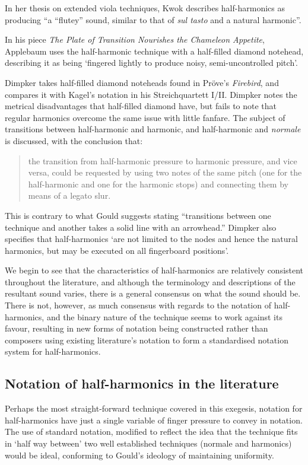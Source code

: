 In her thesis on extended viola techniques, Kwok describes half-harmonics as producing ``a “flutey” sound, similar to that of \emph{sul tasto} and a natural harmonic''.\autocite[]{kwokBreakingSoundBarriers2018}

In his piece \emph{The Plate of Transition Nourishes the Chameleon Appetite}, Applebaum uses the half-harmonic technique with a half-filled diamond notehead, describing it as being `fingered lightly to produce noisy, semi-uncontrolled pitch'.\autocite[]{applebaumPlateTransitionNourishes1992}

Dimpker takes half-filled diamond noteheads found in Pröve's \emph{Firebird}, and compares it with Kagel's notation in his Streichquartett I/II.\autocite[120--121]{dimpkerExtendedNotationDepiction2012}
Dimpker notes the metrical disadvantages that half-filled diamond have, but fails to note that regular harmonics overcome the same issue with little fanfare.
The subject of transitions between half-harmonic and harmonic, and half-harmonic and \emph{normale} is discussed, with the conclusion that:
\begin{quotation}
  the transition from half-harmonic pressure to harmonic pressure, and vice versa, could be requested by using two notes of the same pitch (one for the half-harmonic and one for the harmonic stops) and connecting them by means of a legato slur.\autocite[121]{dimpkerExtendedNotationDepiction2012}
\end{quotation}
This is contrary to what Gould suggests stating ``transitions between one technique and another takes a solid line with an arrowhead.''\autocite[493]{gouldBars2011}
Dimpker also specifies that half-harmonics `are not limited to the nodes and hence the natural harmonics, but may be executed on all fingerboard positions'.\autocite[121]{dimpkerExtendedNotationDepiction2012}

We begin to see that the characteristics of half-harmonics are relatively consistent throughout the literature, and although the terminology and descriptions of the resultant sound varies, there is a general consensus on what the sound should be.
There is not, however, as much consensus with regards to the notation of half-harmonics, and the binary nature of the technique seems to work against its favour, resulting in new forms of notation being constructed rather than composers using existing literature's notation to form a standardised notation system for half-harmonics.
\subsection{Notation of half-harmonics in the literature}
Perhaps the most straight-forward technique covered in this exegesis, notation for half-harmonics have just a single variable of finger pressure to convey in notation.
The use of standard notation, modified to reflect the idea that the technique fits in `half way between' two well established techniques (normale and harmonics) would be ideal, conforming to Gould's ideology of maintaining uniformity.




